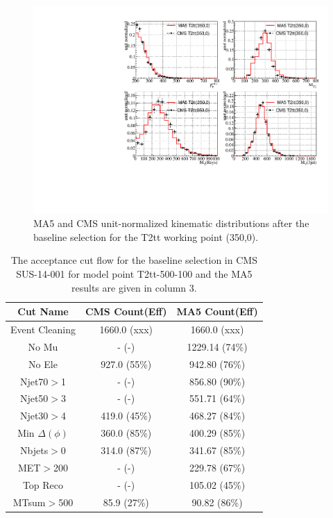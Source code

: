    \begin{figure}
  \centering
    \includegraphics[width=\textwidth]{figures/Appendices/Ma5ValidationSUS13012/T2tt-350-0.pdf}
  \caption{MA5 and CMS unit-normalized kinematic distributions after the baseline
    selection for the T2tt working point (350,0).}
\end{figure}



\begin{table}
    \centering
    \caption{The acceptance cut flow for the baseline selection in CMS SUS-14-001 for
    model point T2tt-500-100 and the MA5 results are given in column 3.}
    \begin{tabular}{  c | c | c  }
    \hline
    \hline
    Cut Name & CMS Count(Eff) & MA5 Count(Eff)\\
    \hline
        Event Cleaning & 1660.0 (xxx) & 1660.0 (xxx)\\
    No Mu & - (-) & 1229.14 (74\%)\\
    No Ele & 927.0 (55\%) & 942.80 (76\%)\\
    Njet70$>$1 & - (-) & 856.80 (90\%)\\
    Njet50$>$3 & - (-) & 551.71 (64\%)\\
    Njet30$>$4 & 419.0 (45\%) & 468.27 (84\%)\\
    Min $\Delta(\phi)$ & 360.0 (85\%) & 400.29 (85\%)\\
    Nbjets$>$0 & 314.0 (87\%) & 341.67 (85\%)\\
    MET$>$200 & - (-) & 229.78 (67\%)\\
    Top Reco & - (-) & 105.02 (45\%)\\
    MTsum$>$500 & 85.9 (27\%) & 90.82 (86\%)\\
\hline
    \hline
    \end{tabular}
    \label{table:T2tt-500-100}
    
    \end{table}

